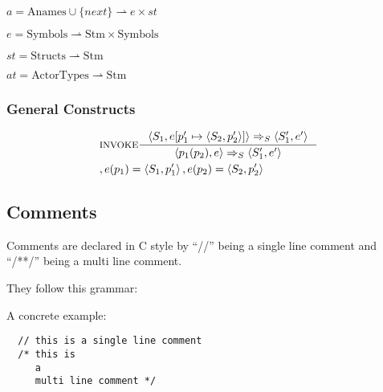 $a = \text{Anames} \cup \{next\} \rightharpoonup e \times st$

$e = \text{Symbols} \rightharpoonup \text{Stm} \times \text{Symbols}$

$st = \text{Structs} \rightharpoonup \text{Stm}$

$at = \text{ActorTypes} \rightharpoonup \text{Stm}$

\subsubsection{General Constructs}
\begin{align*}
&\inference[$\text{INVOKE}$]{\Braket{S_1,e[p_1' \mapsto \Braket{S_2,p_2'}]} \Rightarrow_S \Braket{S_1',e'}}
                  {\Braket{p_1(p_2),e} \Rightarrow_S \Braket{S_1',e'}}
\\
&									{,e(p_1) = \Braket{S_1,p_1'}, e(p_2) = \Braket{S_2,p_2'}}
\end{align*}

\subsection{Comments}
\label{subsec:comments}

Comments are declared in C style by \enquote{//} being a single line comment and \enquote{/**/} being a multi line comment.

They follow this grammar:


A concrete example:

\begin{verbatim}
  // this is a single line comment
  /* this is
     a
     multi line comment */
\end{verbatim}
